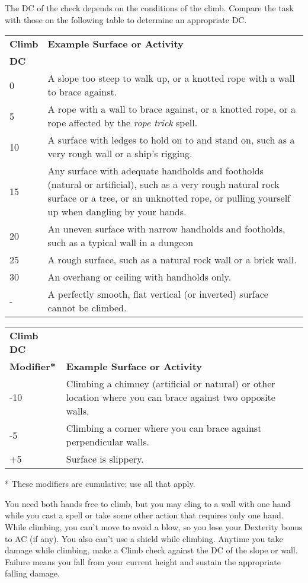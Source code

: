 The DC of the check depends on the conditions of the climb. Compare the task with those on the following table to determine an appropriate DC.
\begin{table}
\sffamily
 \begin{tabularx}{\linewidth}{lX}
\textbf{Climb} & \textbf{Example Surface or Activity} \\
\textbf{DC} & \\
0 & A slope too steep to walk up, or a knotted rope with a wall to brace against.\\
5 & A rope with a wall to brace against, or a knotted rope, or a rope affected by the \textit{rope trick }spell. \\
10 & A surface with ledges to hold on to and stand on, such as a very rough wall or a ship's rigging. \\
15 & Any surface with adequate handholds and footholds (natural or artificial), such as a very rough natural rock surface or a tree, or an unknotted rope, or pulling yourself up when dangling by your hands. \\
20 & An uneven surface with narrow handholds and footholds, such as a typical wall in a dungeon \\
25 & A rough surface, such as a natural rock wall or a brick wall. \\
30 & An overhang or ceiling with handholds only. \\
- & A perfectly smooth, flat vertical (or inverted) surface cannot be climbed.\\
\end{tabularx}
 \begin{tabularx}{\linewidth}{lX}
\textbf{Climb DC} & \\
\textbf{Modifier*} &  \textbf{Example Surface or Activity}\\
-10 & Climbing a chimney (artificial or natural) or other location where you can brace against two opposite walls. \\
-5 & Climbing a corner where you can brace against perpendicular walls.\\
+5 & Surface is slippery.\\
 \end{tabularx}
 * These modifiers are cumulative; use all that apply.
\end{table}

You need both hands free to climb, but you may cling to a wall with one hand while you cast a spell or take some other action that requires only one hand. While climbing, you can't move to avoid a blow, so you lose your Dexterity bonus to AC (if any). You also can't use a shield while climbing. Anytime you take damage while climbing, make a Climb check against the DC of the slope or wall. Failure means you fall from your current height and sustain the appropriate falling damage.
				
